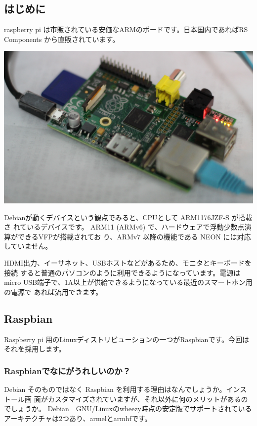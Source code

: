 \documentclass[mingoth,a4paper]{jsarticle}
\begin{document}

\subsection{はじめに}

raspberry pi は市販されている安価なARMのボードです。日本国内であればRS
Components から直販されています。

\includegraphics[width=0.5\hsize]{image201307/raspberrypi.jpg}

Debianが動くデバイスという観点でみると、CPUとして ARM1176JZF-S が搭載さ
れているデバイスです。
ARM11 (ARMv6) で、ハードウェアで浮動少数点演算ができるVFPが搭載されてお
り、ARMv7 以降の機能である NEON には対応していません。

HDMI出力、イーサネット、USBホストなどがあるため、モニタとキーボードを接続
すると普通のパソコンのように利用できるようになっています。電源はmicro
USB端子で、1A以上が供給できるようになっている最近のスマートホン用の電源で
あれば流用できます。

\subsection{Raspbian}

Raspberry pi 用のLinuxディストリビューションの一つがRaspbianです。今回は
それを採用します。

\subsubsection{Raspbianでなにがうれしいのか？}

Debian そのものではなく Raspbian を利用する理由はなんでしょうか。インストール画
面がカスタマイズされていますが、それ以外に何のメリットがあるのでしょうか。
Debian　GNU/Linuxのwheezy時点の安定版でサポートされているアーキテクチャは2つあり、armelとarmhfです。
\end{document}

